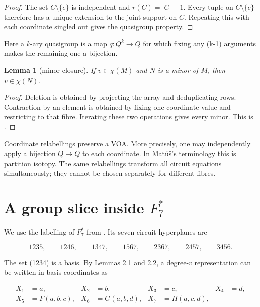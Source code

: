 \documentclass[11pt]{article}
\newtheorem{lemma}[theorem]{Lemma}
\numberwithin{equation}{section}
\begin{document}
\begin{proof}
The set $C\setminus\{e\}$ is independent and
$r(C)=|C|-1$. Every tuple on $C\setminus\{e\}$ therefore has a unique
extension to the joint support on $C$. Repeating this with each coordinate
singled out gives the quasigroup property.
\end{proof}


Here a $k$-ary quasigroup is a map $q:Q^k\to Q$ for which fixing any
(k-1) arguments makes the remaining one a bijection.

\Needspace{0.26\textheight}
\begin{lemma}[minor closure]
If $v\in\chi(M)$ and $N$ is a minor of
$M$, then $v\in\chi(N)$.

\end{lemma}

\begin{proof}
Deletion is obtained by projecting the array and deduplicating
rows. Contraction by an element is obtained by fixing one coordinate value
and restricting to that fibre. Iterating these two operations gives every
minor. This is \cite[Theorem 2]{chen2025}.
\end{proof}


Coordinate relabellings preserve a VOA. More precisely, one may independently
apply a bijection $Q\to Q$ to each coordinate. In Mat\'u\v{s}'s terminology this
is partition isotopy. The same relabellings transform all circuit equations
simultaneously; they cannot be chosen separately for different fibres.

\section{A group slice inside \texorpdfstring{$F_7^*$}{F7*}}


We use the labelling of $F_7^*$ from \cite{chen2025}. Its seven circuit-hyperplanes are

\nopagebreak[4]
\[
1235,\qquad 1246,\qquad 1347,\qquad 1567,\qquad
2367,\qquad 2457,\qquad 3456.             \tag{3.1}
\]

The set (1234) is a basis. By Lemmas 2.1 and 2.2, a degree-$v$
representation can be written in basis coordinates as

\nopagebreak[4]
\[
\begin{aligned}
X_1&=a,&X_2&=b,&X_3&=c,&X_4&=d,\\
X_5&=F(a,b,c),&
X_6&=G(a,b,d),&
X_7&=H(a,c,d),
\end{aligned}                         \tag{3.2}
\]
\end{document}
